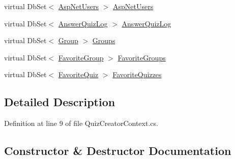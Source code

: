 \begin{DoxyCompactItemize}
virtual Db\+Set$<$ \hyperlink{class_website_1_1_asp_net_users}{Asp\+Net\+Users} $>$ \hyperlink{class_website_1_1_models_1_1_quiz_creator_context_a8f07c4d76f33bf1e98953c6b54e1963b}{Asp\+Net\+Users}
\item 
virtual Db\+Set$<$ \hyperlink{class_website_1_1_models_1_1_answer_quiz_log}{Answer\+Quiz\+Log} $>$ \hyperlink{class_website_1_1_models_1_1_quiz_creator_context_ae072164f7a9c836c35e6a2315f3cad36}{Answer\+Quiz\+Log}
\item 
virtual Db\+Set$<$ \hyperlink{class_website_1_1_models_1_1_group}{Group} $>$ \hyperlink{class_website_1_1_models_1_1_quiz_creator_context_a1c4307f03e443a4cacc4c1d4b79fef18}{Groups}
\item 
virtual Db\+Set$<$ \hyperlink{class_website_1_1_models_1_1_favorite_group}{Favorite\+Group} $>$ \hyperlink{class_website_1_1_models_1_1_quiz_creator_context_ab61dfe4f34469ca14f09532dfb15e976}{Favorite\+Groups}
\item 
virtual Db\+Set$<$ \hyperlink{class_website_1_1_models_1_1_favorite_quiz}{Favorite\+Quiz} $>$ \hyperlink{class_website_1_1_models_1_1_quiz_creator_context_a34827aea33ab169e46052064ea1a1f0e}{Favorite\+Quizzes}
\end{DoxyCompactItemize}


\subsection{Detailed Description}


Definition at line 9 of file Quiz\+Creator\+Context.\+cs.



\subsection{Constructor \& Destructor Documentation}
\hypertarget{class_website_1_1_models_1_1_quiz_creator_context_a47169eb054444d09e3fed4e50baf7b66}{}
